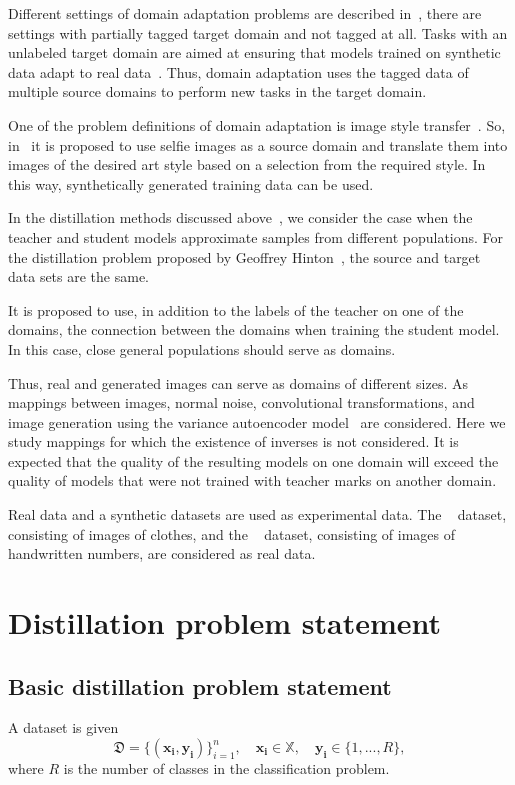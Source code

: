 \documentclass[12pt]{article}
\begin{document}
Different settings of domain adaptation problems are described in~\cite{DeepvisDA}, there are settings with partially tagged target domain and not tagged at all. Tasks with an unlabeled target domain are aimed at ensuring that models trained on synthetic data adapt to real data~\cite{UDA}. Thus, domain adaptation uses the tagged data of multiple source domains to perform new tasks in the target domain.

One of the problem definitions of domain adaptation is image style transfer~\cite{image_to_image, Transfer_Learning}.
So, in~\cite{image_to_image} it is proposed to use selfie images as a source domain and translate them into images of the desired art style based on a selection from the required style. In this way, synthetically generated training data can be used.

In the distillation methods discussed above~\cite{Hinton2015, Vapnik2016, Grabovoy2021}, we consider the case when the teacher and student models approximate samples from different populations. For the distillation problem proposed by Geoffrey Hinton~\cite{Hinton2015}, the source and target data sets are the same.

It is proposed to use, in addition to the labels of the teacher on one of the domains, the connection between the domains when training the student model. In this case, close general populations should serve as domains.

Thus, real and generated images can serve as domains of different sizes. As mappings between images, normal noise, convolutional transformations, and image generation using the variance autoencoder model~\cite{VAE} are considered. Here we study mappings for which the existence of inverses is not considered. It is expected that the quality of the resulting models on one domain will exceed the quality of models that were not trained with teacher marks on another domain.

Real data and a synthetic datasets are used as experimental data. The ~\cite{FMNIST} dataset, consisting of images of clothes, and the ~\cite{MNIST} dataset, consisting of images of handwritten numbers, are considered as real data.

\section{Distillation problem statement}
\subsection{Basic distillation problem statement}
A dataset is given
$$\mathfrak{D}=\{(\mathbf{x_i}, \mathbf{y_i})\}_{i=1}^n,
\quad \mathbf{x_i} \in \mathbb{X},
\quad \mathbf{y_i} \in \{1,...,R\},$$
where $R$ is the number of classes in the classification problem.
\end{document}
